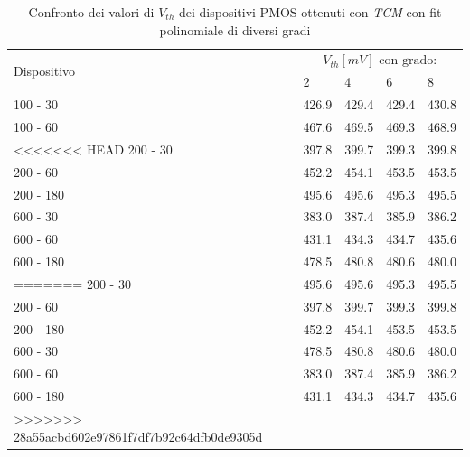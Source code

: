 \documentclass[12pt, letterpaper]{book}
\begin{document}
\begin{table}[h]
  \renewcommand{\arraystretch}{1.3}
  \centering
  \begin{tabular}{m{2cm} m{2cm} m{2cm} m{2cm} m{2cm}}
    \toprule
    \multirow{2}{*}{Dispositivo} & \multicolumn{4}{c}{$V_{th} [mV] \text{ con grado:}$}                         \\
    \cmidrule{2-5}
                                 & 2                                                    & 4     & 6     & 8     \\
    \midrule
    100 - 30                     & 426.9                                                & 429.4 & 429.4 & 430.8 \\
    \hline
    100 - 60                     & 467.6                                                & 469.5 & 469.3 & 468.9 \\
    \hline
<<<<<<< HEAD
    200 - 30                     & 397.8   & 399.7   & 399.3   & 399.8   \\
    \hline
    200 - 60                    & 452.2   & 454.1   & 453.5   & 453.5   \\
    \hline
    200 - 180                     & 495.6   & 495.6   & 495.3   & 495.5   \\
    \hline
    600 - 30                     & 383.0   & 387.4   & 385.9   & 386.2   \\
    \hline
    600 - 60                    & 431.1   & 434.3   & 434.7   & 435.6   \\
    \hline
    600 - 180                     & 478.5   & 480.8   & 480.6   & 480.0   \\
   
=======
    200 - 30                     & 495.6                                                & 495.6 & 495.3 & 495.5 \\
    \hline
    200 - 60                     & 397.8                                                & 399.7 & 399.3 & 399.8 \\
    \hline
    200 - 180                    & 452.2                                                & 454.1 & 453.5 & 453.5 \\
    \hline
    600 - 30                     & 478.5                                                & 480.8 & 480.6 & 480.0 \\
    \hline
    600 - 60                     & 383.0                                                & 387.4 & 385.9 & 386.2 \\
    \hline
    600 - 180                    & 431.1                                                & 434.3 & 434.7 & 435.6 \\
>>>>>>> 28a55acbd602e97861f7df7b92c64dfb0de9305d
    \bottomrule
  \end{tabular}
  \caption{Confronto dei valori di $V_{th}$ dei dispositivi PMOS ottenuti con \emph{TCM} con fit polinomiale di diversi gradi}
  \label{tab:GradiTCM}
\end{table}
\end{document}

